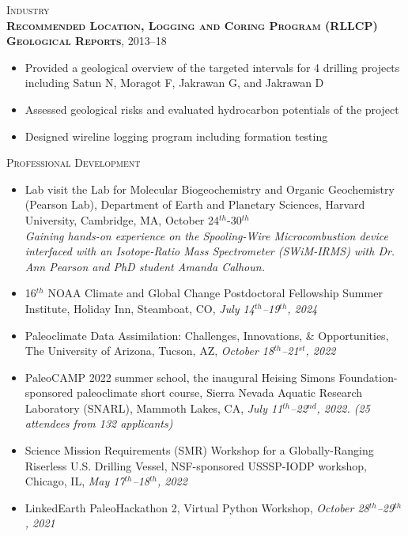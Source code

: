 \documentclass[10pt]{article}
\newcommand{\margintext}[1]{\marginnote{\normalsize\textbf #1 |}}
\begin{document}
\bigskip
\textsc{Industry} \\
\textsc{\textbf{Recommended Location, Logging and Coring Program (RLLCP) Geological Reports}}, 2013–18
\begin{itemize}[leftmargin=*]
    \item Provided a geological overview of the targeted intervals for 4 drilling projects including Satun N, Moragot F, Jakrawan G, and Jakrawan D
    \item Assessed geological risks and evaluated hydrocarbon potentials of the project
    \item Designed wireline logging program including formation testing
\end{itemize} 

\bigskip
\margintext{Workshops}
\textsc{Professional Development}

\begin{itemize}[leftmargin=*]
    \item[] Lab visit the Lab for Molecular Biogeochemistry and Organic Geochemistry (Pearson Lab), Department of Earth and Planetary Sciences, Harvard University, Cambridge, MA, October 24$^{th}$-30$^{th}$ \\
    \footnotesize 
    {\color{gray} \textit{Gaining hands-on experience on the Spooling-Wire Microcombustion device interfaced with an Isotope-Ratio Mass Spectrometer (SWiM-IRMS) with Dr. Ann Pearson and PhD student Amanda Calhoun.}}

    \normalsize
    \item[] 16$^{th}$ NOAA Climate and Global Change Postdoctoral Fellowship Summer Institute, Holiday Inn, Steamboat, CO, \textit{July 14$^{th}$–19$^{th}$, 2024}
    \item[] Paleoclimate Data Assimilation: Challenges, Innovations, \& Opportunities, The University of Arizona, Tucson, AZ, \textit{October 18$^{th}$–21$^{st}$, 2022}
    \item[] PaleoCAMP 2022 summer school, the inaugural Heising Simons Foundation-sponsored paleoclimate short course, Sierra Nevada Aquatic Research Laboratory (SNARL), Mammoth Lakes, CA, \textit{July 11$^{th}$–22$^{nd}$, 2022. (25 attendees from 132 applicants)}
    \item[] Science Mission Requirements (SMR) Workshop for a Globally-Ranging Riserless U.S. Drilling Vessel, NSF-sponsored USSSP-IODP workshop, Chicago, IL, \textit{May 17$^{th}$–18$^{th}$, 2022}
    \item[] LinkedEarth PaleoHackathon 2, Virtual Python Workshop, \textit{October 28$^{th}$–29$^{th}$, 2021}
\end{itemize} 
\end{document}

